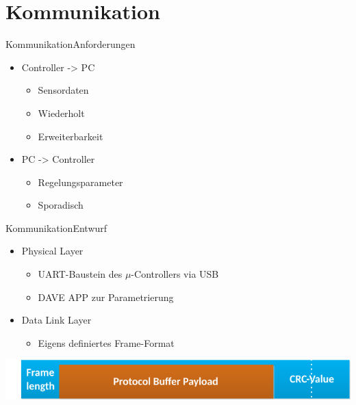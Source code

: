 \section*{Kommunikation}
\begin{frame}{Kommunikation}{Anforderungen}
  \begin{itemize}
    \item Controller -> PC
    \begin{itemize}
    \item Sensordaten
    \item Wiederholt
    \item Erweiterbarkeit
    \end{itemize}
    \item PC -> Controller
    \begin{itemize}
      \item Regelungsparameter
      \item Sporadisch
    \end{itemize}
  \end{itemize}
\end{frame}
\begin{frame}{Kommunikation}{Entwurf}
  \begin{itemize}
    \item Physical Layer
    \begin{itemize}
      \item UART-Baustein des $\mu$-Controllers via USB
      \item DAVE APP zur Parametrierung
    \end{itemize}
    \item Data Link Layer
    \begin{itemize}
      \item Eigens definiertes Frame-Format
    \end{itemize}
  \end{itemize}
  \begin{center}
    \includegraphics[width=\textwidth]{../communication/MessageFormat}
  \end{center}
\end{frame}
